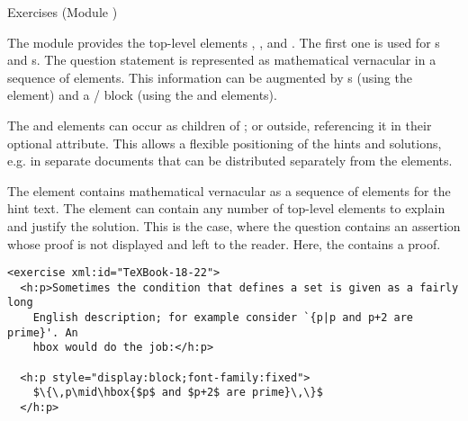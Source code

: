 \begin{module}[id=quiz]
\begin{omgroup}[id=quiz,short=Exercises]{Exercises (Module {})}
\begin{definition}[id=exercise.def]
  The {} module provides the top-level elements {},
  {}, and {}. The first one is used for
  {s} and {s}. The question statement is
  represented as mathematical vernacular in a sequence of {}
  elements. This information can be augmented by {s}
  (using the {} element) and a {}/{}
  block (using the {} and {} elements).
\end{definition}

The {} and {} elements can occur as children of
{}; or outside, referencing it in their optional
{} attribute. This allows a flexible positioning of the hints and
solutions, e.g. in separate documents that can be distributed separately from the
{} elements. 

\begin{definition}[id=hint.def]
  The {} element contains mathematical vernacular as a sequence of
  {} elements for the hint text. The {} element can contain any
  number of {\omdoc} top-level elements to explain and justify the solution.  This is the
  case, where the question contains an assertion whose proof is not displayed and left to
  the reader. Here, the {} contains a proof.
\end{definition}

\begin{lstlisting}[label=lst:texbook-exercise,escapechar=\%,
  caption={An Exercise from the {\TeX}Book},
  index={exercise,hint,solution}]
<exercise xml:id="TeXBook-18-22">
  <h:p>Sometimes the condition that defines a set is given as a fairly long
    English description; for example consider `{p|p and p+2 are prime}'. An 
    hbox would do the job:</h:p>

  <h:p style="display:block;font-family:fixed">
    $\{\,p\mid\hbox{$p$ and $p+2$ are prime}\,\}$
  </h:p>


\end{lstlisting}
\end{omgroup}
\end{module}

